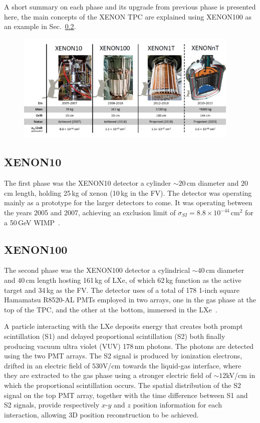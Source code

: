 A short summary on each phase and its upgrade from previous phase is presented here, the main concepts of the XENON TPC are explained using XENON100 as an example in Sec.~\ref{sec:xe100}.


\begin{figure}[t!]
	\centering
	\includegraphics[width=0.95\textwidth]{figs/XePhases.png}
	\label{fig:XenonProg}
\end{figure}


\subsection{XENON10}
\label{sec:xe10}
The first phase was the XENON10 detector a cylinder $\sim 20$\,cm diameter and $20$\,cm length, holding 25\,kg of xenon (10\,kg in the FV). The detector was operating mainly as a prototype for the larger detectors to come. It was operating between the years 2005 and 2007, achieving an exclusion limit of $\sigma_{SI} = 8.8 \times 10^{-44}$\,cm$^2$ for a 50\,GeV WIMP~\cite{Angle:2007uj}.

\subsection{XENON100}
\label{sec:xe100}
The second phase was the XENON100 detector a cylindrical $\sim 40$\,cm diameter and $40$\,cm length hosting 161\,kg of LXe, of which 62\,kg function as the active target and 34\,kg as the FV. The detector uses of a total of 178 1-inch square Hamamatsu R8520-AL PMTs employed in two arrays, one in the gas phase at the top of the TPC, and the other at the bottom, immersed in the LXe~\cite{xe100_instr2012}.

A particle interacting with the LXe deposits energy that creates both
prompt scintillation (S1) and delayed proportional scintillation (S2) both finally producing vacuum ultra violet (VUV) 178\,nm photons. The photons are detected using the two PMT arrays. The S2 signal is produced by ionization electrons, drifted in an electric field of $530$V/cm towards the liquid-gas interface, where they are extracted to the gas phase using a stronger electric field of $\sim12$kV/cm in which the proportional scintillation occurs. 
The spatial distribution of the S2 signal on the top PMT array, together with the time difference between S1 and S2 signals, provide respectively $x$-$y$ and $z$ position information for each interaction, allowing 3D position reconstruction to be achieved.

